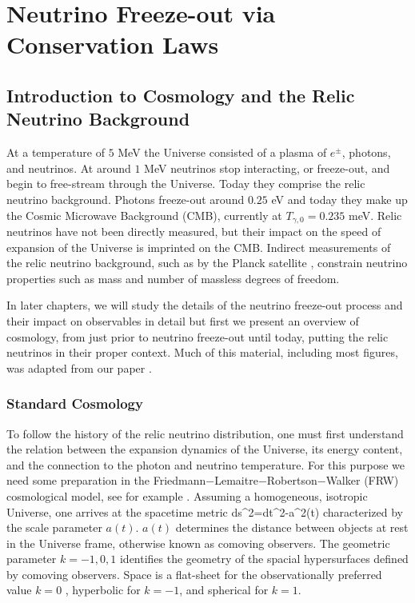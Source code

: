 \part{Neutrino Freeze-out via Conservation Laws}
\chapter{Introduction to Cosmology and the Relic Neutrino Background}\label{ch:intro}

At a temperature of $5$ MeV the Universe consisted of a plasma of $e^\pm$, photons, and neutrinos.  At around $1$ MeV neutrinos stop interacting, or freeze-out, and begin to free-stream through the Universe. Today they comprise the relic neutrino background. Photons freeze-out around $0.25$ eV and today they make up the Cosmic Microwave Background (CMB), currently at $T_{\gamma,0}=0.235$ meV.  Relic neutrinos have not been directly measured, but their impact on the speed of expansion of the Universe is imprinted on the CMB.  Indirect measurements of the relic neutrino background, such as by the Planck satellite \cite{Planck},  constrain neutrino properties such as mass and number of massless degrees of freedom.

 In later chapters, we will study the details of the neutrino freeze-out process and their impact on observables in detail but first we present an overview of cosmology, from just prior to neutrino freeze-out until today, putting the relic neutrinos in their proper context. Much of this material, including most figures, was adapted from our paper \cite{ErasOfUniverse}.


\section{Standard Cosmology}\label{cosmo}
 To follow the history of the relic neutrino distribution, one must first understand the relation between the expansion dynamics of the Universe, its energy content, and the connection to the photon and neutrino temperature. For this purpose we need some preparation in the  Friedmann$-$Lemaitre$-$Robertson$-$Walker (FRW) cosmological  model, see for example \cite{hartle2003gravity,hobson,misner1973gravitation}. Assuming a homogeneous, isotropic Universe, one arrives at the spacetime metric
\beqn\label{metric}
ds^2=dt^2-a^2(t)%
\eeqn
characterized  by the scale parameter $a(t)$.  $a(t)$ determines the distance between objects at rest in the Universe frame, otherwise known as comoving observers. The geometric parameter $k=-1,0,1$ identifies the geometry of the spacial hypersurfaces defined by comoving observers. Space is a flat-sheet for the observationally preferred value $k=0$ \cite{Planck}, hyperbolic for $k=-1$, and spherical for $k=1$.


